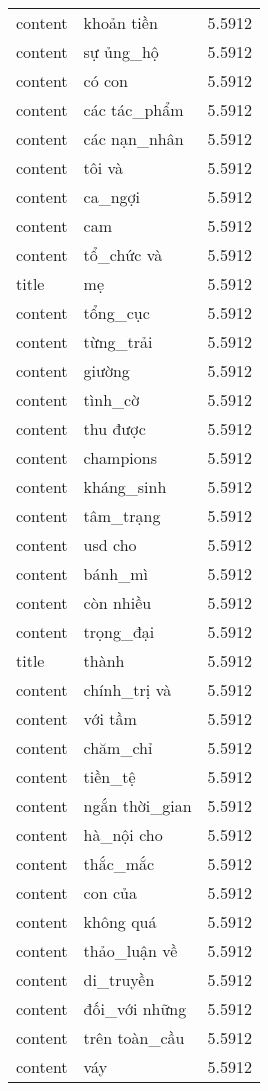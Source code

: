 \documentclass{article}
\begin{document}
\begin{tabular}{lll}
content & khoản tiền & 5.5912\\
content & sự ủng\_hộ & 5.5912\\
content & có con & 5.5912\\
content & các tác\_phẩm & 5.5912\\
content & các nạn\_nhân & 5.5912\\
content & tôi và & 5.5912\\
content & ca\_ngợi & 5.5912\\
content & cam & 5.5912\\
content & tổ\_chức và & 5.5912\\
title & mẹ & 5.5912\\
content & tổng\_cục & 5.5912\\
content & từng\_trải & 5.5912\\
content & giường & 5.5912\\
content & tình\_cờ & 5.5912\\
content & thu được & 5.5912\\
content & champions & 5.5912\\
content & kháng\_sinh & 5.5912\\
content & tâm\_trạng & 5.5912\\
content & usd cho & 5.5912\\
content & bánh\_mì & 5.5912\\
content & còn nhiều & 5.5912\\
content & trọng\_đại & 5.5912\\
title & thành & 5.5912\\
content & chính\_trị và & 5.5912\\
content & với tầm & 5.5912\\
content & chăm\_chỉ & 5.5912\\
content & tiền\_tệ & 5.5912\\
content & ngắn thời\_gian & 5.5912\\
content & hà\_nội cho & 5.5912\\
content & thắc\_mắc & 5.5912\\
content & con của & 5.5912\\
content & không quá & 5.5912\\
content & thảo\_luận về & 5.5912\\
content & di\_truyền & 5.5912\\
content & đối\_với những & 5.5912\\
content & trên toàn\_cầu & 5.5912\\
content & váy & 5.5912\\

\end{tabular}
\end{document}
